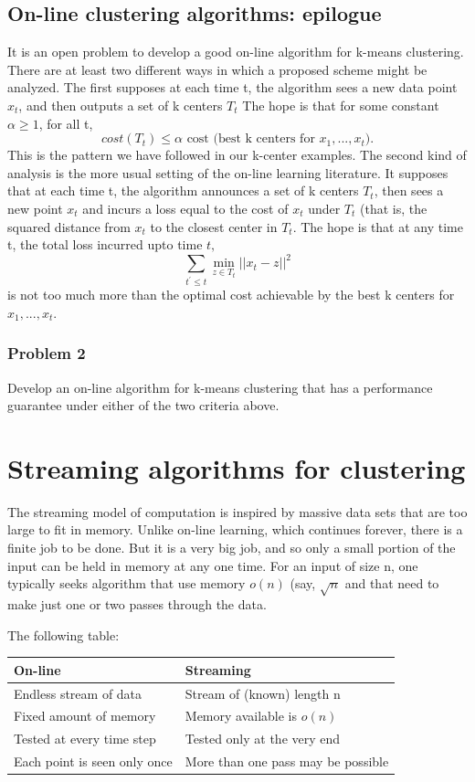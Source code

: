 \documentclass[letterpaper,10pt]{article}
\theoremstyle{plain}
\begin{document}
\subsection{On-line clustering algorithms: epilogue}
It is an open problem to develop a good on-line algorithm for k-means clustering.  There are at least two different ways in which a proposed scheme might be analyzed.  The first supposes at each time t, the algorithm sees a new data point $x_{t}$, and then outputs a set of k centers $T_{t}$  The hope is that for some constant $\alpha\ge1$, for all t, 
\[
cost(T_{t})\le\alpha \text{ cost (best k centers for } x_{1},...,x_{t}).
\]
This is the pattern we have followed in our k-center examples.  The second kind of analysis is the more usual setting of the on-line learning literature.  It supposes that at each time t, the algorithm announces a set of k centers $T_{t}$, then sees a new point $x_{t}$ and incurs a loss equal to the cost of $x_{t}$ under $T_{t}$ (that is, the squared distance from $x_{t}$ to the closest center in $T_{t}$.  The hope is that at any time t, the total loss incurred upto time $t,$ 
\[
\sum_{t^{\prime}\le t}\min_{z\in T_{t}}||x_{t}-z||^{2}
\]
is not too much more than the optimal cost achievable by the best k centers for $x_{1},...,x_{t}.$ 

\subsubsection*{Problem 2}
Develop an on-line algorithm for k-means clustering that has a performance guarantee under either of the two criteria above. 

\section{Streaming algorithms for clustering}
The streaming model of computation is inspired by massive data sets that are too large to fit in memory.  Unlike on-line learning, which continues forever, there is a finite job to be done.  But it is a very big job, and so only a small portion of the input can be held in memory at any one time.  For an input of size n, one typically seeks algorithm that use memory $o(n)$ (say, $\sqrt{n}$ and that need to make just one or two passes through the data. 

The following table: 
\begin{tabular}{|l|l|}
\hline
\textbf{On-line} & \textbf{Streaming} \\
\hline
Endless stream of data & Stream of (known) length n \\
Fixed amount of memory & Memory available is $o(n)$ \\
Tested at every time step & Tested only at the very end \\
Each point is seen only once & More than one pass may be possible \\
\hline
\end{tabular}
\end{document}
